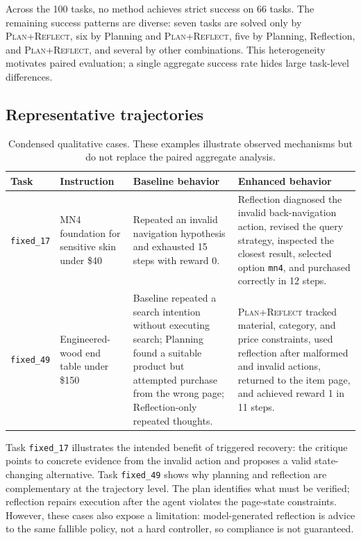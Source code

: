 \documentclass{article}
\newcommand{\method}[1]{\textsc{#1}}
\newcommand{\ours}{\method{Plan+Reflect}\xspace}
\begin{document}
Across the 100 tasks, no method achieves strict success on 66 tasks. The remaining success patterns are diverse: seven tasks are solved only by \ours, six by Planning and \ours, five by Planning, Reflection, and \ours, and several by other combinations. This heterogeneity motivates paired evaluation; a single aggregate success rate hides large task-level differences.

\subsection{Representative trajectories}

\begin{table}[t]
\centering
\caption{Condensed qualitative cases. These examples illustrate observed mechanisms but do not replace the paired aggregate analysis.}
\label{tab:cases}
\small
\setlength{\tabcolsep}{4pt}
\begin{tabular}{lP{0.18\textwidth}P{0.28\textwidth}P{0.30\textwidth}}
\toprule
Task & Instruction & Baseline behavior & Enhanced behavior \\
\midrule
\texttt{fixed\_17} & MN4 foundation for sensitive skin under \$40 & Repeated an invalid navigation hypothesis and exhausted 15 steps with reward 0. & Reflection diagnosed the invalid back-navigation action, revised the query strategy, inspected the closest result, selected option \texttt{mn4}, and purchased correctly in 12 steps. \\
\texttt{fixed\_49} & Engineered-wood end table under \$150 & Baseline repeated a search intention without executing search; Planning found a suitable product but attempted purchase from the wrong page; Reflection-only repeated thoughts. & \ours tracked material, category, and price constraints, used reflection after malformed and invalid actions, returned to the item page, and achieved reward 1 in 11 steps. \\
\bottomrule
\end{tabular}
\end{table}

Task \texttt{fixed\_17} illustrates the intended benefit of triggered recovery: the critique points to concrete evidence from the invalid action and proposes a valid state-changing alternative. Task \texttt{fixed\_49} shows why planning and reflection are complementary at the trajectory level. The plan identifies what must be verified; reflection repairs execution after the agent violates the page-state constraints. However, these cases also expose a limitation: model-generated reflection is advice to the same fallible policy, not a hard controller, so compliance is not guaranteed.
\end{document}
